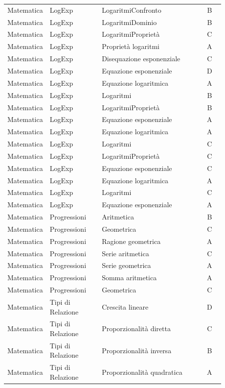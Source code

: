 \documentclass[20pt, a4paper]{article}
\begin{document}
\begin{longtable}{@{}>{\raggedright\arraybackslash}p{0.18\linewidth}>{\raggedright\arraybackslash}p{0.24\linewidth}>{\raggedright\arraybackslash}p{0.46\linewidth}c@{}}
Matematica & LogExp & LogaritmiConfronto & B \\
Matematica & LogExp & LogaritmiDominio & B \\
Matematica & LogExp & LogaritmiProprietà & C \\
Matematica & LogExp & Proprietà logaritmi & A \\
Matematica & LogExp & Disequazione esponenziale & C \\
Matematica & LogExp & Equazione esponenziale & D \\
Matematica & LogExp & Equazione logaritmica & A \\
Matematica & LogExp & Logaritmi & B \\
Matematica & LogExp & LogaritmiProprietà & B \\
Matematica & LogExp & Equazione esponenziale & A \\
Matematica & LogExp & Equazione logaritmica & A \\
Matematica & LogExp & Logaritmi & C \\
Matematica & LogExp & LogaritmiProprietà & C \\
Matematica & LogExp & Equazione esponenziale & C \\
Matematica & LogExp & Equazione logaritmica & A \\
Matematica & LogExp & Logaritmi & C \\
Matematica & LogExp & Equazione esponenziale & A \\
Matematica & Progressioni & Aritmetica & B \\
Matematica & Progressioni & Geometrica & C \\
Matematica & Progressioni & Ragione geometrica & A \\
Matematica & Progressioni & Serie aritmetica & C \\
Matematica & Progressioni & Serie geometrica & A \\
Matematica & Progressioni & Somma aritmetica & A \\
Matematica & Progressioni & Geometrica & C \\
Matematica & Tipi di Relazione & Crescita lineare & D \\
Matematica & Tipi di Relazione & Proporzionalità diretta & C \\
Matematica & Tipi di Relazione & Proporzionalità inversa & B \\
Matematica & Tipi di Relazione & Proporzionalità quadratica & A
\end{longtable}
\end{document}
